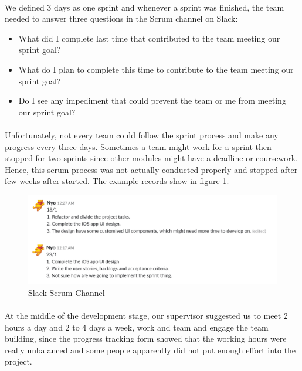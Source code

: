 \documentclass[12pt,a4paper]{article}
\begin{document}
          \paragraph{}We defined 3 days as one sprint and whenever a sprint was finished, the team needed to answer three questions in the Scrum channel on Slack:
          
          \begin{itemize}
            \item What did I complete last time that contributed to the team meeting our sprint goal?
            \item What do I plan to complete this time to contribute to the team meeting our sprint goal?
            \item Do I see any impediment that could prevent the team or me from meeting our sprint goal?
          \end{itemize}    

          \paragraph{}Unfortunately, not every team could follow the sprint process and make any progress every three days. Sometimes a team might work for a sprint then stopped for two sprints since other modules might have a deadline or coursework. Hence, this scrum process was not actually conducted properly and stopped after few weeks after started. The example records show in figure \ref{fig:Slack Scrum Channel}. 

          \begin{figure}[H]
            \centering
            \includegraphics[width=1\textwidth]{../assets/development-records-slack-scrum-channel.png}
            \caption{Slack Scrum Channel}
            \label{fig:Slack Scrum Channel}
          \end{figure}
          
          \paragraph{}At the middle of the development stage, our supervisor suggested us to meet 2 hours a day and 2 to 4 days a week, work and team and engage the team building, since the progress tracking form showed that the working hours were really unbalanced and some people apparently did not put enough effort into the project. 
          
\end{document}
